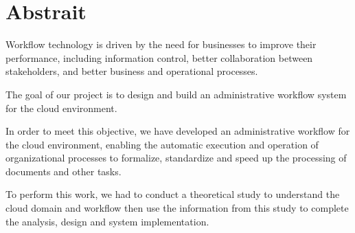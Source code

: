 \chapter*{Abstrait}

Workflow technology is driven by the need for businesses to improve their performance, including information control, better collaboration between stakeholders, and better business and operational processes.

The goal of our project is to design and build an administrative workflow system for the cloud environment.


In order to meet this objective, we have developed an administrative workflow for the cloud environment, enabling the automatic execution and operation of organizational processes to formalize, standardize and speed up the processing of documents and other tasks.

To perform this work, we had to conduct a theoretical study to understand the cloud domain and workflow then use the information from this study to complete the analysis, design and system implementation.


 
